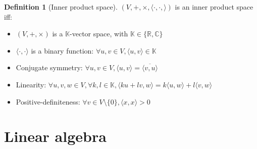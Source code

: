 \documentclass{article}
\theoremstyle{definition}
\newtheorem{definition}{Definition}[section]
\theoremstyle{remark}
\newtheorem*{remark}{Remark}
\theoremstyle{example}
\begin{document}
\begin{definition}[Inner product space]
		$(V, +, \times, \langle \cdot, \cdot, \rangle)$ is an inner product space iff:
		\begin{itemize}
				\item $(V, +, \times)$ is a $\mathbb{K}$-vector space, with $\mathbb{K} \in \{\mathbb{R}, \mathbb{C}\}$
				\item $\langle \cdot, \cdot \rangle$ is a binary function: $\forall u, v \in V, \langle u, v \rangle \in \mathbb{K}$
				\item Conjugate symmetry: $\forall u, v \in V, \langle u, v \rangle = \overline{\langle v, u \rangle}$
				\item Linearity: $\forall u, v, w \in V, \forall k, l \in \mathbb{K}, \langle ku + lv, w \rangle = k\langle u, w \rangle + l\langle v, w \rangle$
				\item Positive-definiteness: $\forall v \in V\setminus\{0\}, \langle x, x \rangle > 0$
		\end{itemize}
\end{definition}

\section{Linear algebra}



\end{document}
